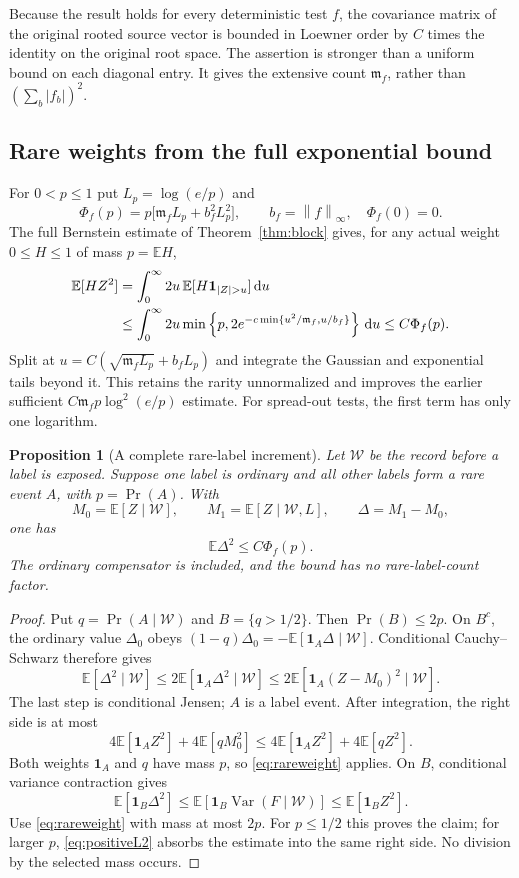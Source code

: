 \documentclass[11pt,letterpaper]{article}
\numberwithin{equation}{section}
\newtheorem{proposition}[theorem]{Proposition}
\theoremstyle{definition}\newtheorem{definition}[theorem]{Definition}
\theoremstyle{remark}\newtheorem{remark}[theorem]{Remark}
\newcommand{\E}{\mathbb E}\newcommand{\Var}{\operatorname{Var}}
\newcommand{\mf}{\mathfrak m_f}\newcommand{\eps}{\varepsilon}
\newcommand{\norm}[1]{\left\lVert #1\right\rVert}
\begin{document}
Because the result holds for every deterministic test $f$, the covariance matrix of the original rooted source vector is bounded in Loewner order by $C$ times the identity on the original root space. The assertion is stronger than a uniform bound on each diagonal entry. It gives the extensive count $\mf$, rather than $(\sum_b|f_b|)^2$.

\subsection{Rare weights from the full exponential bound}

For $0<p\le1$ put $L_p=\log(e/p)$ and
\begin{equation}
 \Phi_f(p)=p\bigl[\mf L_p+b_f^2L_p^2\bigr],\qquad b_f=\norm f_\infty,
 \quad \Phi_f(0)=0.
 \label{eq:rarebudget}
\end{equation}
The full Bernstein estimate of Theorem~\ref{thm:block} gives, for any actual weight $0\le H\le1$ of mass $p=\E H$,
\begin{align}
 \E[HZ^2]
 &=\int_0^\infty2u\,\E[H\mathbf1_{|Z|>u}]\,\dd u\notag\\
 &\le\int_0^\infty2u\min\left\{p,
  2e^{-c\min\{u^2/\mf,u/b_f\}}\right\}\,\dd u
 \le C\Phi_f(p).
 \label{eq:rareweight}
\end{align}
Split at $u=C(\sqrt{\mf L_p}+b_fL_p)$ and integrate the Gaussian and exponential tails beyond it. This retains the rarity unnormalized and improves the earlier sufficient $C\mf p\log^2(e/p)$ estimate. For spread-out tests, the first term has only one logarithm.

\begin{proposition}[A complete rare-label increment]
Let $\mathcal W$ be the record before a label is exposed. Suppose one label is ordinary and all other labels form a rare event $A$, with $p=\Pr(A)$. With
\[
 M_0=\E[Z\mid\mathcal W],\qquad
 M_1=\E[Z\mid\mathcal W,L],\qquad \Delta=M_1-M_0,
\]
one has
\begin{equation}
 \E\Delta^2\le C\Phi_f(p).
 \label{eq:rarelabel}
\end{equation}
The ordinary compensator is included, and the bound has no rare-label-count factor.
\end{proposition}
\begin{proof}
Put $q=\Pr(A\mid\mathcal W)$ and $B=\{q>1/2\}$. Then $\Pr(B)\le2p$. On $B^c$, the ordinary value $\Delta_0$ obeys
$(1-q)\Delta_0=-\E[\mathbf1_A\Delta\mid\mathcal W]$.
Conditional Cauchy--Schwarz therefore gives
\[
 \E[\Delta^2\mid\mathcal W]
 \le2\E[\mathbf1_A\Delta^2\mid\mathcal W]
 \le2\E[\mathbf1_A(Z-M_0)^2\mid\mathcal W].
\]
The last step is conditional Jensen; $A$ is a label event. After integration, the right side is at most
\[
 4\E[\mathbf1_A Z^2]+4\E[qM_0^2]
 \le4\E[\mathbf1_A Z^2]+4\E[qZ^2].
\]
Both weights $\mathbf1_A$ and $q$ have mass $p$, so \eqref{eq:rareweight} applies. On $B$, conditional variance contraction gives
\[
 \E[\mathbf1_B\Delta^2]
 \le\E[\mathbf1_B\Var(F\mid\mathcal W)]
 \le\E[\mathbf1_BZ^2].
\]
Use \eqref{eq:rareweight} with mass at most $2p$. For $p\le1/2$ this proves the claim; for larger $p$, \eqref{eq:positiveL2} absorbs the estimate into the same right side. No division by the selected mass occurs.
\end{proof}
\end{document}

